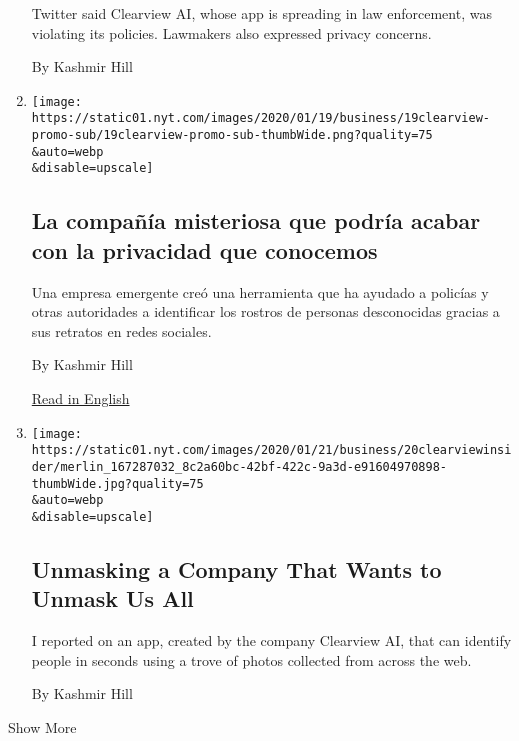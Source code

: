 \begin{enumerate}
  Twitter said Clearview AI, whose app is spreading in law enforcement,
  was violating its policies. Lawmakers also expressed privacy concerns.

  By Kashmir Hill
\item
  \href{/es/2020/01/20/espanol/negocios/clearview-reconocimiento-facial.html}{}

  \texttt{[image: https://static01.nyt.com/images/2020/01/19/business/19clearview-promo-sub/19clearview-promo-sub-thumbWide.png?quality=75\\\&auto=webp\\\&disable=upscale]}

  \hypertarget{la-compauxf1uxeda-misteriosa-que-podruxeda-acabar-con-la-privacidad-que-conocemos}{%
  \subsection{La compañía misteriosa que podría acabar con la privacidad
  que
  conocemos}\label{la-compauxf1uxeda-misteriosa-que-podruxeda-acabar-con-la-privacidad-que-conocemos}}

  Una empresa emergente creó una herramienta que ha ayudado a policías y
  otras autoridades a identificar los rostros de personas desconocidas
  gracias a sus retratos en redes sociales.

  By Kashmir Hill

  \href{https://www.nytimes.com/2020/01/18/technology/clearview-privacy-facial-recognition.html}{Read
  in English}
\item
  \href{/2020/01/20/reader-center/insider-clearview-ai.html}{}

  \texttt{[image: https://static01.nyt.com/images/2020/01/21/business/20clearviewinsider/merlin\_167287032\_8c2a60bc-42bf-422c-9a3d-e91604970898-thumbWide.jpg?quality=75\\\&auto=webp\\\&disable=upscale]}

  \hypertarget{unmasking-a-company-that-wants-to-unmask-us-all}{%
  \subsection{Unmasking a Company That Wants to Unmask Us
  All}\label{unmasking-a-company-that-wants-to-unmask-us-all}}

  I reported on an app, created by the company Clearview AI, that can
  identify people in seconds using a trove of photos collected from
  across the web.

  By Kashmir Hill
\end{enumerate}

Show More

